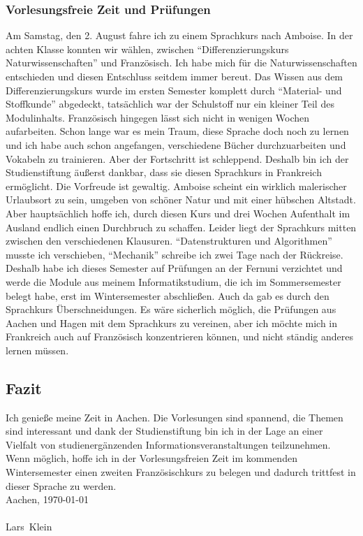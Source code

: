 \documentclass[12pt]{article}
\newcommand{\Datum}{\today}
\newcommand{\Nachname}{Klein}
\newcommand{\Vorname}{Lars}
\newcommand{\Ort}{Aachen}
\begin{document}
\begin{large}
\subsubsection*{Vorlesungsfreie Zeit und Prüfungen}
Am Samstag, den 2. August fahre ich zu einem Sprachkurs nach Amboise. 
In der achten Klasse konnten wir wählen, zwischen “Differenzierungskurs Naturwissenschaften” und Französisch. Ich habe mich für die Naturwissenschaften entschieden und diesen Entschluss seitdem immer bereut. Das Wissen aus dem Differenzierungskurs wurde im ersten Semester komplett durch “Material- und Stoffkunde” abgedeckt, tatsächlich war der Schulstoff nur ein kleiner Teil des Modulinhalts. Französisch hingegen lässt sich nicht in wenigen Wochen aufarbeiten. Schon lange war es mein Traum, diese Sprache doch noch zu lernen und ich habe auch schon angefangen, verschiedene Bücher durchzuarbeiten und Vokabeln zu trainieren. Aber der Fortschritt ist schleppend. Deshalb bin ich der Studienstiftung äußerst dankbar, dass sie diesen Sprachkurs in Frankreich ermöglicht. Die Vorfreude ist gewaltig. Amboise scheint ein wirklich malerischer Urlaubsort zu sein, umgeben von schöner Natur und mit einer hübschen Altstadt. Aber hauptsächlich hoffe ich, durch diesen Kurs und drei Wochen Aufenthalt im Ausland endlich einen Durchbruch zu schaffen.
\newline
\newline
Leider liegt der Sprachkurs mitten zwischen den verschiedenen Klausuren. “Datenstrukturen und Algorithmen” musste ich verschieben, “Mechanik” schreibe ich zwei Tage nach der Rückreise. Deshalb habe ich dieses Semester auf Prüfungen an der Fernuni verzichtet und werde die Module aus meinem Informatikstudium, die ich im Sommersemester belegt habe, erst im Wintersemester abschließen. Auch da gab es durch den Sprachkurs Überschneidungen. Es wäre sicherlich möglich, die Prüfungen aus Aachen und Hagen mit dem Sprachkurs zu vereinen, aber ich möchte mich in Frankreich auch auf Französisch konzentrieren können, und nicht ständig anderes lernen müssen.
\newline
\newline
\pagebreak
\subsection*{Fazit}
Ich genieße meine Zeit in Aachen. Die Vorlesungen sind spannend, die Themen sind interessant und dank der Studienstiftung bin ich in der Lage an einer Vielfalt von studienergänzenden Informationsveranstaltungen teilzunehmen. Wenn möglich, hoffe ich in der Vorlesungsfreien Zeit im kommenden Wintersemester einen zweiten Französischkurs zu belegen und dadurch trittfest in dieser Sprache zu werden.
\newline
\newline
\\
\Ort, \Datum\\
\\
\Vorname~\Nachname

\end{large}
\end{document}
